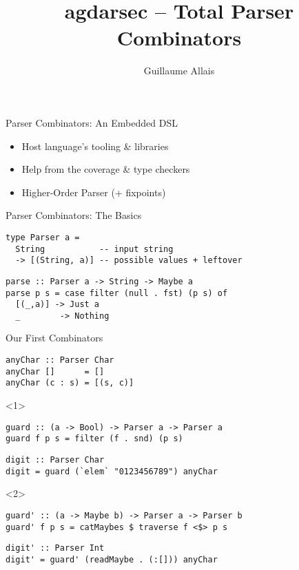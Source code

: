 \documentclass{beamer}
\title{agdarsec -- Total Parser Combinators}
\author{Guillaume Allais}
\institute[Radboud University Nijmegen]{
  Brouwer Seminar \\
  Radboud University Nijmegen}
\begin{document}
\maketitle

\begin{frame}{Parser Combinators: An Embedded DSL}

\begin{itemize}
  \item Host language's tooling \& libraries
  \item Help from the coverage \& type checkers
  \item Higher-Order Parser (+ fixpoints)
\end{itemize}

\end{frame}

\begin{frame}[fragile]{Parser Combinators: The Basics}

\begin{verbatim}
type Parser a =
  String           -- input string
  -> [(String, a)] -- possible values + leftover
\end{verbatim}

\begin{verbatim}
parse :: Parser a -> String -> Maybe a
parse p s = case filter (null . fst) (p s) of
  [(_,a)] -> Just a
  _        -> Nothing 
\end{verbatim}
\end{frame}

\begin{frame}[fragile]{Our First Combinators}
\begin{verbatim}
anyChar :: Parser Char
anyChar []      = []
anyChar (c : s) = [(s, c)]
\end{verbatim}
\begin{onlyenv}<1>
\begin{verbatim}
guard :: (a -> Bool) -> Parser a -> Parser a
guard f p s = filter (f . snd) (p s)
\end{verbatim}
\begin{verbatim}
digit :: Parser Char
digit = guard (`elem` "0123456789") anyChar
\end{verbatim}
\end{onlyenv}
\begin{onlyenv}<2>
\begin{verbatim}
guard' :: (a -> Maybe b) -> Parser a -> Parser b
guard' f p s = catMaybes $ traverse f <$> p s
\end{verbatim}
\begin{verbatim}
digit' :: Parser Int
digit' = guard' (readMaybe . (:[])) anyChar
\end{verbatim}
\end{onlyenv}
\end{frame}
\end{document}
